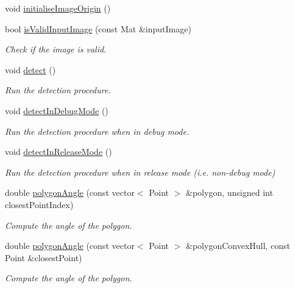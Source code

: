 \begin{DoxyCompactItemize}
void \hyperlink{classmultiscale_1_1analysis_1_1Detector_a0d5677f992e9d9272eb70c08b86e9338}{initialise\-Image\-Origin} ()
\item 
bool \hyperlink{classmultiscale_1_1analysis_1_1Detector_ad0473d0ad9988c84ae88c9cf6adf19be}{is\-Valid\-Input\-Image} (const Mat \&input\-Image)
\begin{DoxyCompactList}\small\item\em Check if the image is valid. \end{DoxyCompactList}\item 
void \hyperlink{classmultiscale_1_1analysis_1_1Detector_ae0c0a72fef22d6521e82c18424a4dd04}{detect} ()
\begin{DoxyCompactList}\small\item\em Run the detection procedure. \end{DoxyCompactList}\item 
void \hyperlink{classmultiscale_1_1analysis_1_1Detector_aa9173a243a85e2d9cf493a641fb610aa}{detect\-In\-Debug\-Mode} ()
\begin{DoxyCompactList}\small\item\em Run the detection procedure when in debug mode. \end{DoxyCompactList}\item 
void \hyperlink{classmultiscale_1_1analysis_1_1Detector_a58665776f1a12659dae08d1a4a01050a}{detect\-In\-Release\-Mode} ()
\begin{DoxyCompactList}\small\item\em Run the detection procedure when in release mode (i.\-e. non-\/debug mode) \end{DoxyCompactList}\item 
double \hyperlink{classmultiscale_1_1analysis_1_1Detector_ada30f980ed5ce2f975bb827c393b8cd0}{polygon\-Angle} (const vector$<$ Point $>$ \&polygon, unsigned int closest\-Point\-Index)
\begin{DoxyCompactList}\small\item\em Compute the angle of the polygon. \end{DoxyCompactList}\item 
double \hyperlink{classmultiscale_1_1analysis_1_1Detector_a80dd82a52bdc63bee7f94d4c8403a785}{polygon\-Angle} (const vector$<$ Point $>$ \&polygon\-Convex\-Hull, const Point \&closest\-Point)
\begin{DoxyCompactList}\small\item\em Compute the angle of the polygon. \end{DoxyCompactList}\item 

\end{DoxyCompactItemize}
